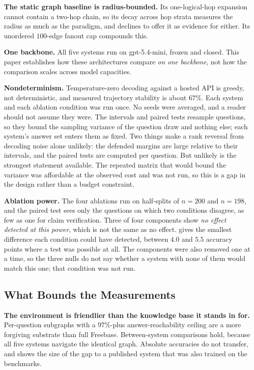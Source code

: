\textbf{The static graph baseline is radius-bounded.} Its
one-logical-hop expansion cannot contain a two-hop chain, so its decay
across hop strata measures the radius as much as the paradigm, and
 declines to offer it as evidence for either. Its
unordered $100$-edge fanout cap compounds this.

\textbf{One backbone.} All five systems run on \textsf{gpt-5.4-mini},
frozen and closed. This paper establishes how these architectures
compare \emph{on one backbone}, not how the comparison scales across
model capacities.

\textbf{Nondeterminism.} Temperature-zero decoding against a hosted API
is greedy, not deterministic, and measured trajectory stability is about
$67\%$. Each system and each ablation condition was run once. No seeds
were averaged, and a reader should not assume they were. The intervals
and paired tests resample questions, so they bound the sampling variance
of the question draw and nothing else; each system's answer set enters
them as fixed. Two things make a rank reversal from decoding noise alone
unlikely: the defended margins are large relative to their intervals,
and the paired tests are computed per question. But unlikely is the
strongest statement available. The repeated matrix that would bound the
variance was affordable at the observed cost and was not run, so this is
a gap in the design rather than a budget constraint.

\textbf{Ablation power.} The four ablations run on half-splits of $n =
200$ and $n = 198$, and the paired test sees only the questions on which
two conditions disagree, as few as one for claim verification. Three of
four components show \emph{no effect detected at this power}, which is
not the same as no effect.  gives the smallest
difference each condition could have detected, between $4.0$ and $5.5$
accuracy points where a test was possible at all. The components were
also removed one at a time, so the three nulls do not say whether a
system with none of them would match this one; that condition was not
run.

\subsection{What Bounds the Measurements}\label{sec:limits-measurement}

\textbf{The environment is friendlier than the knowledge base it stands
in for.} Per-question subgraphs with a $97\%$-plus answer-reachability
ceiling are a more forgiving substrate than full Freebase.
Between-system comparisons hold, because all five systems navigate the
identical graph. Absolute accuracies do not transfer, and 
shows the size of the gap to a published system that was also trained on
the benchmarks.

